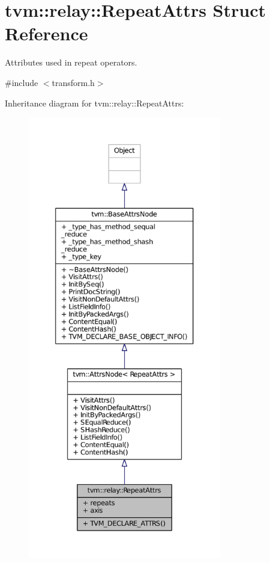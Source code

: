 \hypertarget{structtvm_1_1relay_1_1RepeatAttrs}{}\section{tvm\+:\+:relay\+:\+:Repeat\+Attrs Struct Reference}
\label{structtvm_1_1relay_1_1RepeatAttrs}


Attributes used in repeat operators.  




{\ttfamily \#include $<$transform.\+h$>$}



Inheritance diagram for tvm\+:\+:relay\+:\+:Repeat\+Attrs\+:
\nopagebreak
\begin{figure}[H]
\begin{center}
\leavevmode
\includegraphics[height=550pt]{structtvm_1_1relay_1_1RepeatAttrs__inherit__graph}
\end{center}
\end{figure}


